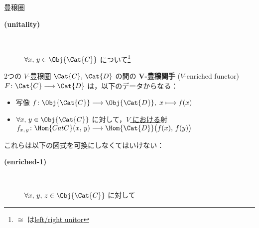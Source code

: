 \documentclass[TQFT_main]{subfiles}
\begin{document}
\begin{mydef}[label=def:enriched,breakable]{豊穣圏}
\begin{description}
        \item[\textbf{(unitality)}]　
        
        $\forall x,\, y \in \Obj{\Cat{C}}$ について\footnote{$\cong$ は\hyperref[def:monoidal-category]{left/right unitor}}
        \begin{center}
        \end{center}
        
    \end{description}

    \tcblower

    2つの $V$-豊穣圏 $\Cat{C},\, \Cat{D}$ の間の $\bm{V}$\textbf{-豊穣関手} ($V$-enriched functor) $F \colon \Cat{C} \lto \Cat{D}$ は，以下のデータからなる：
    \begin{itemize}
        \item 写像 $f\colon \Obj{\Cat{C}} \lto \Obj{\Cat{D}},\; x \lmto f(x)$
        \item $\forall x,\, y \in \Obj{\Cat{C}}$ に対して，\underline{$V$ における}射 $f_{x,\, y} \colon \Hom{Cat{C}} (x,\, y) \lto \Hom{\Cat{D}} \bigl( f(x),\, f(y) \bigr)$
    \end{itemize}
    これらは以下の図式を可換にしなくてはいけない：
    \begin{description}
        \item[\textbf{(enriched-1)}]　
        
        $\forall x,\, y,\, z \in \Obj{\Cat{C}}$ に対して
        \begin{center}
        \end{center}
        

\end{description}
\end{mydef}
\end{document}
